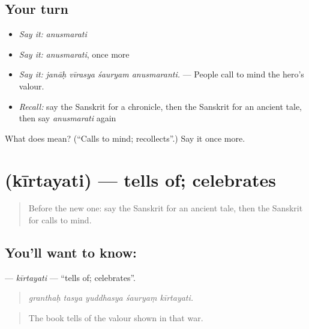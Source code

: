 \subsection*{Your turn}
\begin{itemize}
\raggedright
  \item \emph{Say it:} \emph{anusmarati}
  \item \emph{Say it:} \emph{anusmarati}, once more
  \item \emph{Say it:} \emph{janāḥ vīrasya śauryam anusmaranti.} — People call to mind the hero's valour.
  \item \emph{Recall:} say the Sanskrit for a chronicle, then the Sanskrit for an ancient tale, then say \emph{anusmarati} again
\end{itemize}

\begin{tcolorbox}[breakable,colback=teal!4,colframe=teal!35!black,title={Before you move on}]
What does  mean? (\textquotedblleft{}Calls to mind; recollects\textquotedblright{}.) Say it once more.
\end{tcolorbox}
\section[\texorpdfstring{\sk{कीर्तयति} (kīrtayati)}{कीर्तयति (kīrtayati)}]{ (kīrtayati) — tells of; celebrates}

\label{lesson:SA-C324-kirtayati}



\begin{quote}
Before the new one: say the Sanskrit for an ancient tale, then the Sanskrit for calls to mind.
\end{quote}

\subsection*{You'll want to know: }
\textbf{} — \emph{kīrtayati} — \textquotedblleft{}tells of; celebrates\textquotedblright{}.

\begin{quote}
    
\end{quote}

\begin{quote}
\emph{granthaḥ tasya yuddhasya śauryaṃ kīrtayati.}
\end{quote}

\begin{quote}
The book tells of the valour shown in that war.
\end{quote}

